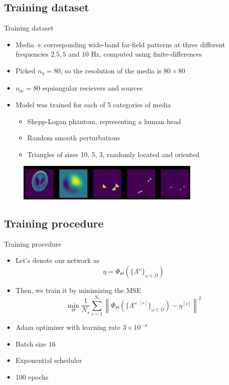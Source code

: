 \documentclass{beamer}
\begin{document}
\subsection{Training dataset}
\begin{frame}{Training dataset}
    \begin{itemize}
        \item Media + corresponding wide-band far-field patterns at three different frequencies $2.5, 5$ and $10$ Hz, computed using finite-differences
        \item Picked $n_\eta = 80$, so the resolution of the media is $80 \times 80$
        \item $n_\text{sc} = 80$ equiangular recievers and sources
        \item Model was trained for each of 5 categories of media
        \begin{itemize}
            \item Shepp-Logan phantom, representing a human head
            \item  Random smooth perturbations
            \item Triangles of sizes 10, 5, 3, randomly located and oriented
        \end{itemize}
    \end{itemize}
    \begin{figure}
        \centering
        \includegraphics[width=0.8\textwidth]{images/data.png}
    \end{figure}
\end{frame}

\subsection{Training procedure}
\begin{frame}{Training procedure}
    \begin{itemize}
        \item Let's denote our network as 
        \begin{equation}
            \eta = \Phi_\Theta (\{\Lambda^\omega\}_{\omega \in \bar{\Omega}})
        \end{equation}
        \item Then, we train it by minimizing the MSE
        \begin{equation}
            \min_{\Theta}{\frac{1}{N_s}\sum_{s=1}^{N_s}\left\|\Phi_{\Theta}(\{\Lambda^{\omega,[s]}\}_{\omega \in \bar{\Omega}})-\eta^{[s]}\right\|^2}
        \end{equation}
        \item Adam optimizer with learning rate $3 \times 10^{-4}$
        \item Batch size $16$
        \item Exponential scheduler 
        \item 100 epochs
    \end{itemize}
\end{frame}
\end{document}
